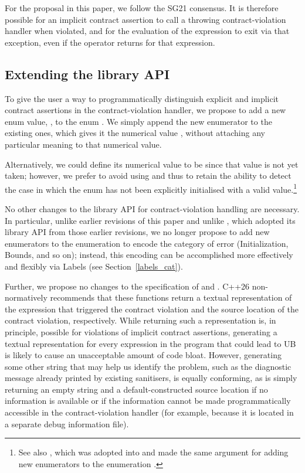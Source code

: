 {For the proposal in this paper, we follow the SG21 consensus. It is therefore possible for an implicit contract assertion to call a throwing contract-violation handler when violated, and for the evaluation of the expression to exit via that exception, even if the  operator returns  for that expression.

\subsection{Extending the library API}
\label{library}

To give the user a way to programmatically distinguish explicit and implicit contract assertions in the contract-violation handler, we propose to add a new enum value, , to the enum \mbox{}. We simply append the new enumerator to the existing ones, which gives it the numerical value , without attaching any particular meaning to that numerical value.

Alternatively, we could define its numerical value to be  since that value is not yet taken; however, we prefer to avoid using  and thus to retain the ability to detect the case in which the enum has not been explicitly initialised with a valid value.\footnote{See also \cite{P3227R0}, which was adopted into \cite{P2900R14} and made the same argument for adding new enumerators to the enumeration .}

No other changes to the library API for contract-violation handling are necessary. In particular, unlike earlier revisions of this paper and unlike \cite{P3081R1}, which adopted its library API from those earlier revisions, we no longer propose to add new enumerators to the enumeration \mbox{} to encode the category of error (Initialization, Bounds, and so on); instead, this encoding can be accomplished more effectively and flexibly via Labels (see Section~\ref{labels_cat}).

Further, we propose no changes to the specification of  and . C++26 non-normatively recommends that these functions return a textual representation of the expression that triggered the contract violation and the source location of the contract violation, respectively. While returning such a representation is, in principle, possible for violations of implicit contract assertions, generating a textual representation for every expression in the program that could lead to UB is likely to cause an unacceptable amount of code bloat. However, generating some other string that may help us identify the problem, such as the diagnostic message already printed by existing sanitisers, is equally conforming, as is simply returning an empty string and a default-constructed source location if no information is available or if the information cannot be made programmatically accessible in the contract-violation handler (for example,
because it is located in a separate debug information file). 

}
